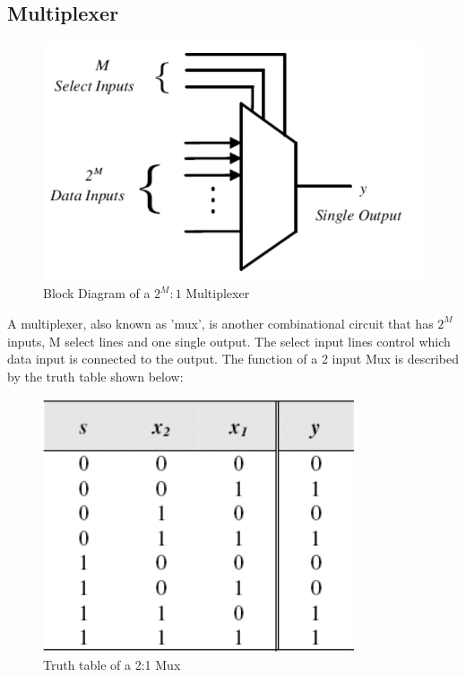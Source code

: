\subsection*{Multiplexer}

\begin{figure}[H]
  \begin{centering}
  \includegraphics[scale=1]{data/muxB.png}
  \par\end{centering}
  \caption{Block Diagram of a $2^{M}:1$ Multiplexer}
\end{figure}

A multiplexer, also known as 'mux', is another combinational circuit that has $2^{M}$ inputs, M select lines and one single output. The select input lines control which data input is connected to the output. The function of a 2 input Mux is described by the truth table shown below:


\begin{figure}[H]
  \begin{centering}
  \includegraphics[scale=1]{data/muxtable.png}
  \par\end{centering}
  \caption{Truth table of a 2:1 Mux}
\end{figure}


